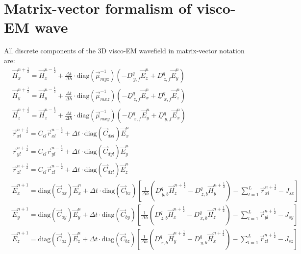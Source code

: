 \documentclass[pdftex,a4paper,parskip,listof=totoc,bibliography=totoc,onehalfspacing,12pt]{scrreprt}
\begin{document}
\section{Matrix-vector formalism of visco-EM wave}
All discrete components of the 3D visco-EM wavefield in matrix-vector notation are: 
\begin{equation}	
\begin{aligned}
  &\vec{H}_{x}^{n+\frac{1}{2}} = \vec{H}_{x}^{n-\frac{1}{2}} + \frac{\Delta t}{\Delta h} \cdot  \mathrm{diag} \left(\vec{\mu}_{myz}^{-1}\right)  \left(- \underline{D}_{\,y,f}^q \vec{E}_{z}^{n} + \underline{D}_{\,z,f}^q \vec{E}_{y}^{n} \right)\\
  &\vec{H}_{y}^{n+\frac{1}{2}} = \vec{H}_{y}^{n-\frac{1}{2}} + \frac{\Delta t}{\Delta h} \cdot  \mathrm{diag} \left(\vec{\mu}_{mxz}^{-1}\right)  \left(- \underline{D}_{\,z,f}^q \vec{E}_{x}^{n} + \underline{D}_{\,x,f}^q \vec{E}_z^{n} \right)\\
  &\vec{H}_{z}^{n+\frac{1}{2}} = \vec{H}_{z}^{n-\frac{1}{2}} + \frac{\Delta t}{\Delta h} \cdot  \mathrm{diag} \left(\vec{\mu}_{mxy}^{-1}\right)  \left(- \underline{D}_{\,x,f}^q \vec{E}_y^{n} + \underline{D}_{\,y,f}^q \vec{E}_x^{n} \right)\\  
  &\vec{r}_{xl}^{n+\frac{1}{2}} =  C_{c l} \vec{r}_{xl}^{n-\frac{1}{2}} + \Delta t \cdot \mathrm{diag} \left(\vec{C}_{d x l}\right) \vec{E}_{x}^{n} \\
  &\vec{r}_{yl}^{n+\frac{1}{2}} =  C_{c l} \vec{r}_{yl}^{n-\frac{1}{2}} + \Delta t \cdot \mathrm{diag} \left(\vec{C}_{d y l}\right) \vec{E}_{y}^{n}\\
  &\vec{r}_{zl}^{n+\frac{1}{2}} =  C_{c l} \vec{r}_{zl}^{n-\frac{1}{2}} + \Delta t \cdot \mathrm{diag} \left(\vec{C}_{d z l}\right) \vec{E}_{z}^{n}\\
  &\vec{E}_{x}^{n+1} =  \mathrm{diag} \left(\vec{C}_{ax}\right) \vec{E}_{x}^{n} + \Delta t \cdot \mathrm{diag} \left(\vec{C}_{bx}\right) \left[ \frac{1}{\Delta h} \left( \underline{D}_{\,y,b}^q \vec{H}_z^{n+\frac{1}{2}} - \underline{D}_{\,z,b}^q \vec{H}_y^{n+\frac{1}{2}} \right) - \sum_{l=1}^L \vec{r}_{xl}^{n+\frac{1}{2}} - J_{sx} \right]\\ 
  &\vec{E}_{y}^{n+1} =  \mathrm{diag} \left(\vec{C}_{ay}\right) \vec{E}_{y}^{n} + \Delta t \cdot \mathrm{diag} \left(\vec{C}_{by}\right) \left[ \frac{1}{\Delta h} \left( \underline{D}_{\,z,b}^q  \vec{H}_x^{n+\frac{1}{2}} - \underline{D}_{\,x,b}^q \vec{H}_z^{n+\frac{1}{2}} \right) - \sum_{l=1}^L \vec{r}_{yl}^{n+\frac{1}{2}} - J_{sy} \right]\\ 
  &\vec{E}_{z}^{n+1} =  \mathrm{diag} \left(\vec{C}_{az}\right) \vec{E}_{z}^{n} + \Delta t \cdot \mathrm{diag} \left(\vec{C}_{bz}\right) \left[ \frac{1}{\Delta h} \left(\underline{D}_{\,x,b}^q \vec{H}_y^{n+\frac{1}{2}} - \underline{D}_{\,y,b}^q \vec{H}_x^{n+\frac{1}{2}} \right) - \sum_{l=1}^L  \vec{r}_{zl}^{n+\frac{1}{2}} - J_{sz} \right]
\end{aligned}
\end{equation}
\end{document}
